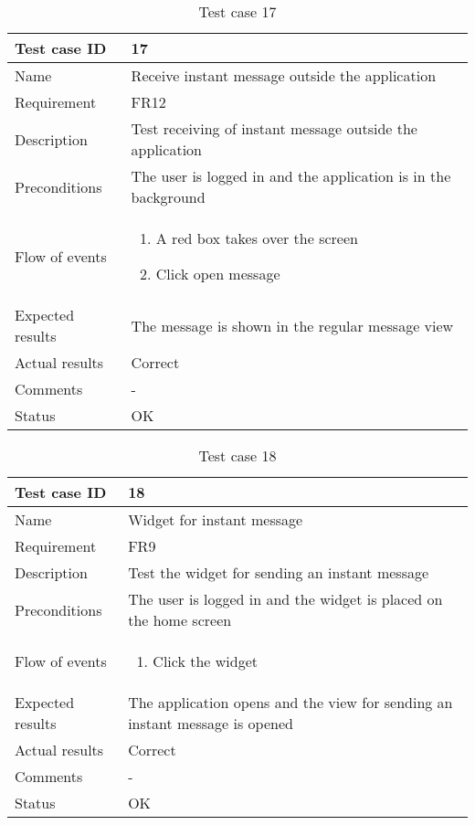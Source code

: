 		\begin{table}
			\begin{tabular}{l|p{10cm}}
				Test case ID & 17 \\ \hline
				Name & Receive instant message outside the application\\ \hline
				Requirement & FR12\\ \hline
				Description & Test receiving of instant message outside the application\\ \hline
				Preconditions & The user is logged in and the application is in the background\\ \hline
				Flow of events & 
					\begin{enumerate}
						\item{}A red box takes over the screen
						\item{}Click open message
					\end{enumerate} \\ \hline
				Expected results & The message is shown in the regular message view\\ \hline
				Actual results &Correct\\ \hline
				Comments &-\\ \hline
				Status & OK\\ \hline
			\end{tabular}
			\caption{Test case 17} \label{tab:case17}
		\end{table}

		\begin{table}
			\begin{tabular}{l|p{10cm}}
				Test case ID & 18 \\ \hline
				Name & Widget for instant message\\ \hline
				Requirement & FR9\\ \hline
				Description & Test the widget for sending an instant message\\ \hline
				Preconditions & The user is logged in and the widget is placed on the home screen\\ \hline
				Flow of events & 
					\begin{enumerate}
						\item{}Click the widget
					\end{enumerate} \\ \hline
				Expected results & The application opens and the view for sending an instant message is opened\\ \hline
				Actual results & Correct\\ \hline
				Comments &-\\ \hline
				Status &OK \\ \hline
			\end{tabular}
			\caption{Test case 18} \label{tab:case18}
		\end{table}

